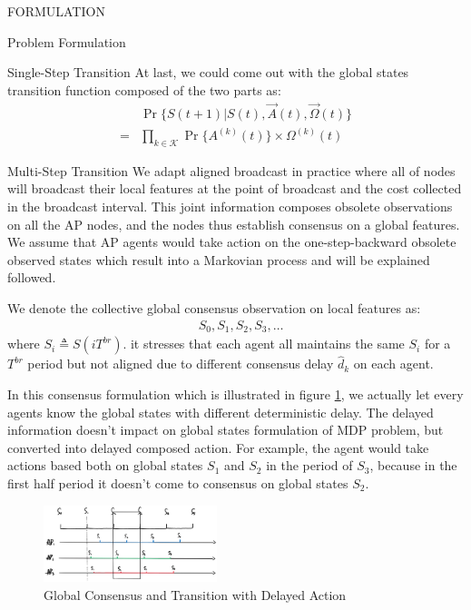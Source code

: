 \documentclass[10pt, conference, letterpaper]{IEEEtran}
\begin{document}
\begin{section}{FORMULATION}
\begin{subsection}{Problem Formulation}
\begin{subsubsection}{Single-Step Transition}
                At last, we could come out with the global states transition function composed of the two parts as:
                \begin{align}
                    & \Pr\{ S(t+1)|S(t), \vec{A}(t), \vec{\Omega}(t)  \}
                    \nonumber\\
                    = & \prod_{k \in \mathcal{K}} \Pr\{ A^{(k)}(t) \} \times \Omega^{(k)}(t)
                \end{align}
            \end{subsubsection}

            \begin{subsubsection}{Multi-Step Transition}
                We adapt aligned broadcast in practice where all of nodes will broadcast their local features at the point of broadcast and the cost collected in the broadcast interval.
                This joint information composes obsolete observations on all the AP nodes, and the nodes thus establish consensus on a global features. We assume that AP agents would take action on the one-step-backward obsolete observed states which result into a Markovian process and will be explained followed.

                We denote the collective global consensus observation on local features as:
                \begin{align*}
                    & S_0, S_1, S_2, S_3, \dots
                \end{align*}
                where $S_i \triangleq S(iT^{br})$. it stresses that each agent all maintains the same $S_i$ for a $T^{br}$ period but not aligned due to different consensus delay $\hat{d}_k$ on each agent.

                In this consensus formulation which is illustrated in figure \ref{fig:br-trans}, we actually let every agents know the global states with different deterministic delay. The delayed information doesn't impact on global states formulation of MDP problem, but converted into delayed composed action. For example, the agent would take actions based both on global states $S_1$ and $S_2$ in the period of $S_3$, because in the first half period it doesn't come to consensus on global states $S_2$.

                \begin{figure}[h]
                    \centering
                    \includegraphics[width=0.45\textwidth]{broadcast-trans.png}
                    \caption{Global Consensus and Transition with Delayed Action}
                    \label{fig:br-trans}
                \end{figure}


\end{subsubsection}
\end{subsection}
\end{section}
\end{document}
